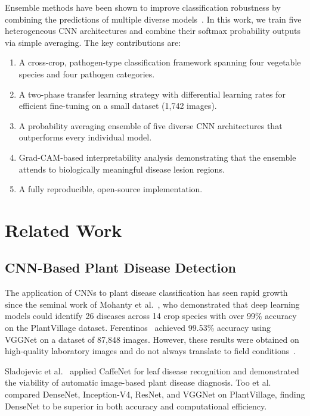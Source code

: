 \documentclass[conference]{IEEEtran}
\begin{document}
Ensemble methods have been shown to improve classification robustness by combining the predictions of multiple diverse models~\cite{hansen1990neural,dietterich2000ensemble}. In this work, we train five heterogeneous CNN architectures and combine their softmax probability outputs via simple averaging. The key contributions are:

\begin{enumerate}
    \item A cross-crop, pathogen-type classification framework spanning four vegetable species and four pathogen categories.
    \item A two-phase transfer learning strategy with differential learning rates for efficient fine-tuning on a small dataset (1,742 images).
    \item A probability averaging ensemble of five diverse CNN architectures that outperforms every individual model.
    \item Grad-CAM-based interpretability analysis demonstrating that the ensemble attends to biologically meaningful disease lesion regions.
    \item A fully reproducible, open-source implementation.
\end{enumerate}

\section{Related Work}

\subsection{CNN-Based Plant Disease Detection}

The application of CNNs to plant disease classification has seen rapid growth since the seminal work of Mohanty et al.~\cite{mohanty2016using}, who demonstrated that deep learning models could identify 26 diseases across 14 crop species with over 99\% accuracy on the PlantVillage dataset. Ferentinos~\cite{ferentinos2018deep} achieved 99.53\% accuracy using VGGNet on a dataset of 87,848 images. However, these results were obtained on high-quality laboratory images and do not always translate to field conditions~\cite{kamilaris2018deep}.

Sladojevic et al.~\cite{sladojevic2016deep} applied CaffeNet for leaf disease recognition and demonstrated the viability of automatic image-based plant disease diagnosis. Too et al.~\cite{too2019comparative} compared DenseNet, Inception-V4, ResNet, and VGGNet on PlantVillage, finding DenseNet to be superior in both accuracy and computational efficiency.
\end{document}
